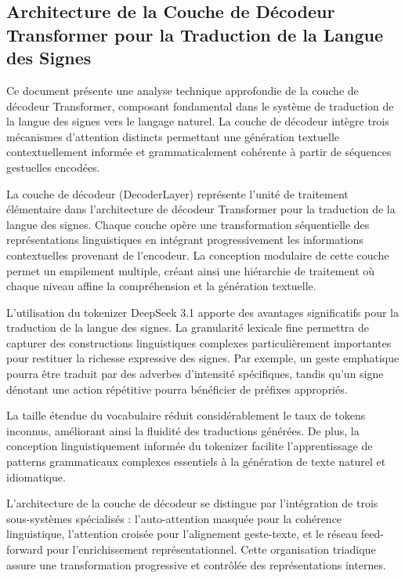 \documentclass[12pt]{article}
\begin{document}
    \subsection{Architecture de la Couche de Décodeur Transformer pour la
Traduction de la Langue des
Signes}\label{architecture-de-la-couche-de-duxe9codeur-transformer-pour-la-traduction-de-la-langue-des-signes}

Ce document présente une analyse technique approfondie de la couche de
décodeur Transformer, composant fondamental dans le système de
traduction de la langue des signes vers le langage naturel. La couche de
décodeur intègre trois mécanismes d'attention distincts permettant une
génération textuelle contextuellement informée et grammaticalement
cohérente à partir de séquences gestuelles encodées.

La couche de décodeur (DecoderLayer) représente l'unité de traitement
élémentaire dans l'architecture de décodeur Transformer pour la
traduction de la langue des signes. Chaque couche opère une
transformation séquentielle des représentations linguistiques en
intégrant progressivement les informations contextuelles provenant de
l'encodeur. La conception modulaire de cette couche permet un empilement
multiple, créant ainsi une hiérarchie de traitement où chaque niveau
affine la compréhension et la génération textuelle.

L'utilisation du tokenizer DeepSeek 3.1 apporte des avantages
significatifs pour la traduction de la langue des signes. La granularité
lexicale fine permettra de capturer des constructions linguistiques
complexes particulièrement importantes pour restituer la richesse
expressive des signes. Par exemple, un geste emphatique pourra être
traduit par des adverbes d'intensité spécifiques, tandis qu'un signe
dénotant une action répétitive pourra bénéficier de préfixes appropriés.

La taille étendue du vocabulaire réduit considérablement le taux de
tokens inconnus, améliorant ainsi la fluidité des traductions générées.
De plus, la conception linguistiquement informée du tokenizer facilite
l'apprentissage de patterns grammaticaux complexes essentiels à la
génération de texte naturel et idiomatique.

L'architecture de la couche de décodeur se distingue par l'intégration
de trois sous-systèmes spécialisés : l'auto-attention masquée pour la
cohérence linguistique, l'attention croisée pour l'alignement
geste-texte, et le réseau feed-forward pour l'enrichissement
représentationnel. Cette organisation triadique assure une
transformation progressive et contrôlée des représentations internes.
\end{document}
